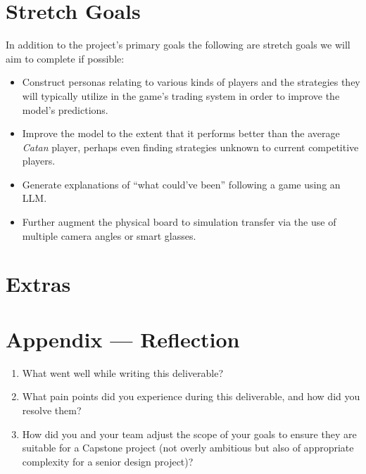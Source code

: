 \documentclass{article}
\begin{document}
\section{Stretch Goals}\label{sec:stretch-goals}
In addition to the project’s primary goals the following are stretch goals we will aim to complete if possible:
\begin{itemize}
    \item Construct personas relating to various kinds of players and the strategies they will typically utilize in the game’s trading system in order to improve the model’s predictions.
    \item Improve the model to the extent that it performs better than the average \emph{Catan} player, perhaps even finding strategies unknown to current competitive players.
    \item Generate explanations of “what could’ve been” following a game using an LLM\@.
    \item Further augment the physical board to simulation transfer via the use of multiple camera angles or smart glasses.
\end{itemize}


\section{Extras}\label{sec:extras}



\newpage{}

\section*{Appendix --- Reflection}

\begin{enumerate}
    \item What went well while writing this deliverable?
    \item What pain points did you experience during this deliverable, and how
    did you resolve them?
    \item How did you and your team adjust the scope of your goals to ensure
    they are suitable for a Capstone project (not overly ambitious but also of
    appropriate complexity for a senior design project)?
\end{enumerate}


\end{document}
